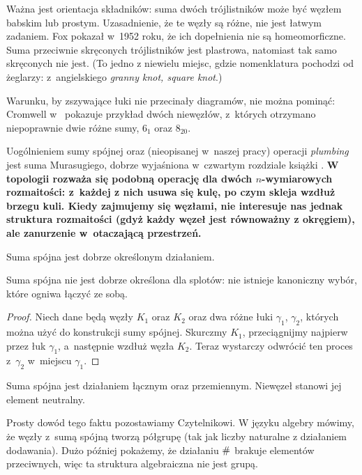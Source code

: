 Ważna jest orientacja składników: suma dwóch trójlistników może być węzłem babskim lub prostym.
Uzasadnienie, że te węzły są różne, nie jest łatwym zadaniem.
Fox pokazał w~1952 roku, że ich dopełnienia nie są homeomorficzne.
Suma przeciwnie skręconych trójlistników jest plastrowa, natomiast tak samo skręconych nie jest.
(To jedno z niewielu miejsc, gdzie nomenklatura pochodzi od żeglarzy: z~angielskiego \emph{granny knot, square knot}.)

Warunku, by zszywające łuki nie przecinały diagramów, nie można pominąć: Cromwell w~\cite[s.90]{cromwell04} pokazuje przykład dwóch niewęzłów, z~których otrzymano niepoprawnie dwie różne sumy, $6_1$ oraz $8_{20}$.

Uogólnieniem sumy spójnej oraz (nieopisanej w~naszej pracy) operacji \emph{plumbing} jest suma Murasugiego, dobrze wyjaśniona w~czwartym rozdziale książki \cite{kawauchi96}.
\textbf{W topologii rozważa się podobną operację dla dwóch $n$-wymiarowych rozmaitości: z~każdej z nich usuwa się kulę, po czym skleja wzdłuż brzegu kuli.
Kiedy zajmujemy się węzłami, nie interesuje nas jednak struktura rozmaitości (gdyż każdy węzeł jest równoważny z okręgiem), ale zanurzenie w~otaczającą przestrzeń.}

\begin{proposition}
    Suma spójna jest dobrze określonym działaniem.
\end{proposition}

Suma spójna nie jest dobrze określona dla splotów:
nie istnieje kanoniczny wybór, które ogniwa łączyć ze sobą.

\begin{proof}
    Niech dane będą węzły $K_1$ oraz $K_2$
    oraz dwa różne łuki $\gamma_1$, $\gamma_2$,
    których można użyć do konstrukcji sumy spójnej.
    Skurczmy $K_1$, przeciągnijmy najpierw przez łuk $\gamma_1$, a~następnie wzdłuż węzła $K_2$.
    Teraz wystarczy odwrócić ten proces z~$\gamma_2$ w~miejscu $\gamma_1$.
\end{proof}

\begin{proposition}
    Suma spójna jest działaniem łącznym oraz przemiennym.
    Niewęzeł stanowi jej element neutralny.
\end{proposition}

Prosty dowód tego faktu pozostawiamy Czytelnikowi.
W języku algebry mówimy, że węzły z~sumą spójną tworzą półgrupę (tak jak liczby naturalne z działaniem dodawania).
Dużo później pokażemy, że działaniu $\mathbin{\#}$ brakuje elementów przeciwnych, więc ta struktura algebraiczna nie jest grupą.

